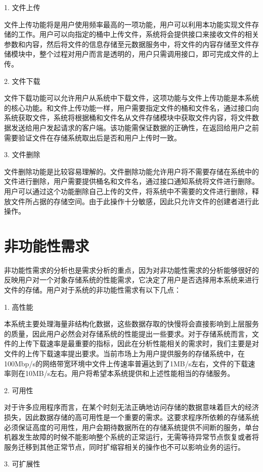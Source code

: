 1. 文件上传

文件上传功能将是用户使用频率最高的一项功能，用户可以利用本功能实现文件存储的工作。用户可以向指定的桶中上传文件，系统将会提供接口来接收文件的相关参数和内容，然后将文件的信息存储至元数据服务中，将文件的内容存储至文件存储模块中，整个过程对用户而言是透明的，用户只需调用接口，即可完成文件的上传。

2. 文件下载

文件下载功能可以允许用户从系统中下载文件，这项功能与文件上传功能是本系统的核心功能。和文件上传功能一样，用户需要指定文件的桶和文件名，通过接口向系统获取文件，系统将根据桶和文件名从文件存储模块中获取文件内容，将文件数据发送给用户发起请求的客户端。该功能需保证数据的正确性，在返回给用户之前需要验证文件在存储系统取出后是否和用户上传时一致。

3. 文件删除

文件删除功能是比较容易理解的。文件删除功能允许用户将不需要存储在系统中的文件进行删除，用户需要提供桶名和文件名，通过接口通知系统将文件进行删除。用户可以通过这个功能删除自己上传的文件，将系统中不需要的文件进行删除，释放文件所占据的存储空间。由于此操作十分敏感，因此只允许文件的创建者进行此操作。

\section{非功能性需求}
非功能性需求的分析也是需求分析的重点，因为对非功能性需求的分析能够很好的反映用户对一个对象存储系统的性能需求，它决定了用户是否选择用本系统来进行文件的存储。用户对于系统的非功能性需求有以下几点：

1. 高性能

本系统主要处理海量非结构化数据，这些数据存取的快慢将会直接影响到上层服务的质量，因此用户必然会对存储系统的性能提出一些要求。对于存储系统而言，文件的上传下载速率是最重要的指标，因此在分析性能相关的需求时，我们主要是对文件的上传下载速率提出要求。当前市场上为用户提供服务的存储系统中，在100Mbp/s的网络带宽环境中文件上传速率普遍达到了1MB/s左右，文件的下载速率则在10MB/s左右。用户将希望本系统提供和上述性能相当的存储服务。

2. 可用性

对于许多应用程序而言，在某个时刻无法正确地访问存储的数据意味着巨大的经济损失，因此数据存储的高可用性是一个重要的需求。这要求程序所依赖的存储系统必须保证高度的可用性，用户会期待数据所在的存储系统提供不间断的服务，单台机器发生故障的时候不能影响整个系统的正常运行，无需等待异常节点恢复或者将服务迁移到其他正常节点，同时扩缩容相关的操作也不可以影响业务的运行。

3. 可扩展性

